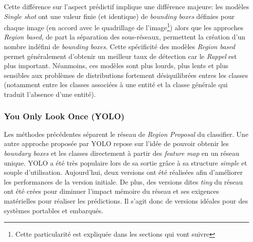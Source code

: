 \noindent Cette différence sur l'aspect prédictif implique une différence majeure: les modèles \textit{Single shot} ont une valeur finie (et identique) de \textit{bounding boxes} définies pour chaque image (en accord avec le quadrillage de l'image\footnote{Cette particularité est expliquée dans les sections qui vont suivre}) alors que les approches \textit{Region based}, de part la séparation des sous-réseaux, permettent la création d'un nombre indéfini de \textit{bounding boxes}. Cette spécificité des modèles \textit{Region based} permet généralement d'obtenir un meilleur taux de détection car le \textit{Rappel} est plus important. Néanmoins, ces modèles sont plus lourds, plus lents et plus sensibles aux problèmes de distributions fortement désiquilibrées entres les classes (notamment entre les classes associées à une entité et la classe générale qui traduit l'absence d'une entité).

\subsubsection{You Only Look Once (YOLO)}
Les méthodes précédentes séparent le réseau de \textit{Region Proposal} du classifier. Une autre approche proposée par YOLO repose  sur l'idée de pouvoir obtenir les \textit{boundary boxes} et les classes directement à partir des \textit{feature map} en un réseau unique. YOLO a été très populaire lors de sa sortie grâce à sa structure \textit{simple} et souple d'utilisation. Aujourd'hui, deux versions ont été réalisées afin d'améliorer les performances de la version initiale. De plus, des versions dites \textit{tiny} du réseau ont été crées pour diminuer l'impact mémoire du réseau et ses exigences matérielles pour réaliser les prédictions. Il s'agit donc de versions idéales pour des systèmes portables et embarqués.

